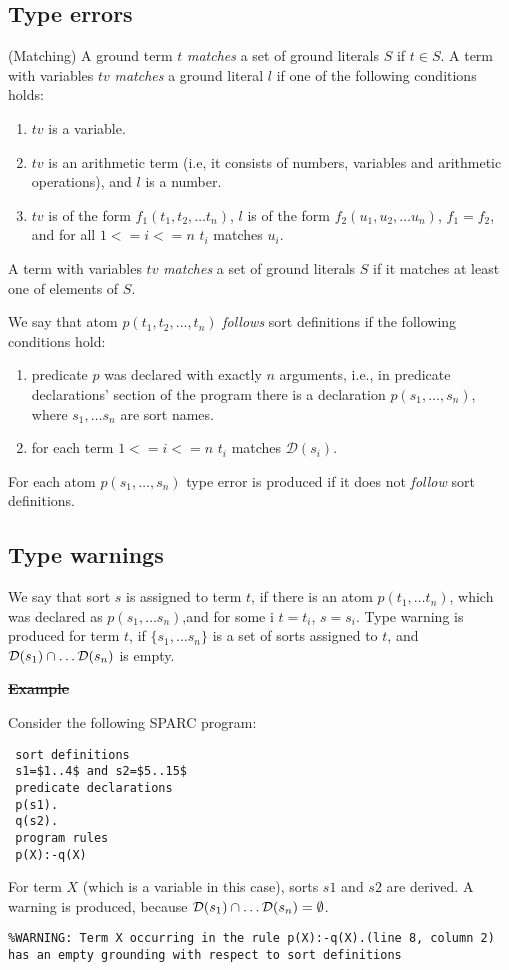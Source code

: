 \documentclass[12pt, letterpaper]{article}
\begin{document}
\subsection{Type errors}
\begin{definition} (Matching)
A ground term $t$ \textit{matches} a set of ground literals $S$ if $t\in S$.
A term with variables $tv$  \textit{matches}  a ground literal $l$ if one of the following conditions holds:
\begin{enumerate}
 \item $tv$ is a variable.
 \item $tv$ is an arithmetic term (i.e, it consists of numbers, variables and arithmetic operations), and $l$ is a number.
 \item $tv$ is of the form $f_1(t_1,t_2,\ldots t_n)$, $l$ is of the form $f_2(u_1,u_2,\ldots u_n)$, $f_1=f_2$, and for all $1<=i<=n$ $t_i$ matches $u_i$.
\end{enumerate}
A term with variables $tv$  \textit{matches}  a set of  ground literals $S$ if it matches at least one of elements of $S$.
\end{definition}

We say that atom $p(t_1,t_2,\ldots,t_n)$  \textit{follows} sort definitions if the following conditions hold:
\begin{enumerate}
\item predicate $p$ was declared with exactly $n$ arguments, i.e., in predicate declarations' section of the program there is a declaration 
$p(s_1,\ldots,s_n)$, where $s_1,\ldots s_n$ are sort names.
\item for each term $1<=i<=n$ $t_i$ matches $\mathcal{D}(s_i)$. 
\end{enumerate}
For each atom $p(s_1,\ldots,s_n)$ type error is produced if it does not \textit{follow} sort definitions.

\subsection{Type warnings}
We say that sort $s$ is assigned to term $t$, if there is an atom $p(t_1,\ldots t_n)$,   which was declared as $p(s_1,\ldots s_n)$,and for some i $t=t_i$, $s=s_i$.
Type warning is produced for term $t$, if $\{s_1,\ldots s_n\}$ is a set of  sorts assigned to $t$, and $ {\cal D}(s_1) \cap \ldots {\cal D}(s_n)$ is empty.

\st \textbf{Example} 

Consider the following SPARC program:
\begin{verbatim}
 sort definitions
 s1=$1..4$ and s2=$5..15$ 
 predicate declarations
 p(s1).
 q(s2).  
 program rules
 p(X):-q(X)

\end{verbatim}
 For term $X$ (which is a variable in this case), sorts $s1$ and $s2$ are derived. 
 A warning is produced, because ${\cal D}(s_1) \cap \ldots {\cal D}(s_n)=\emptyset$.  
\begin{verbatim} 
%WARNING: Term X occurring in the rule p(X):-q(X).(line 8, column 2) has an empty grounding with respect to sort definitions
\end{verbatim}
\end{document}
